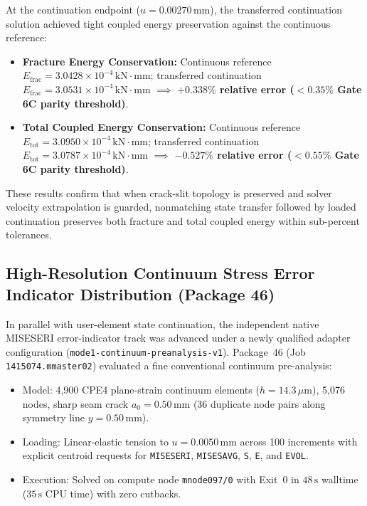 At the continuation endpoint ($u = 0.00270\,\mathrm{mm}$), the transferred continuation solution achieved tight coupled energy preservation against the continuous reference:
\begin{itemize}
  \item \textbf{Fracture Energy Conservation:} Continuous reference $E_{\mathrm{frac}} = 3.0428 \times 10^{-4}\,\mathrm{kN\cdot mm}$; transferred continuation $E_{\mathrm{frac}} = 3.0531 \times 10^{-4}\,\mathrm{kN\cdot mm}$ $\implies$ \textbf{$\mathbf{+0.338\%}$ relative error ($< 0.35\%$ Gate 6C parity threshold)}.
  \item \textbf{Total Coupled Energy Conservation:} Continuous reference $E_{\mathrm{tot}} = 3.0950 \times 10^{-4}\,\mathrm{kN\cdot mm}$; transferred continuation $E_{\mathrm{tot}} = 3.0787 \times 10^{-4}\,\mathrm{kN\cdot mm}$ $\implies$ \textbf{$\mathbf{-0.527\%}$ relative error ($< 0.55\%$ Gate 6C parity threshold)}.
\end{itemize}
These results confirm that when crack-slit topology is preserved and solver velocity extrapolation is guarded, nonmatching state transfer followed by loaded continuation preserves both fracture and total coupled energy within sub-percent tolerances.

\subsection{High-Resolution Continuum Stress Error Indicator Distribution (Package 46)}
\label{subsec:method_c_continuum_preanalysis}

In parallel with user-element state continuation, the independent native MISESERI error-indicator track was advanced under a newly qualified adapter configuration (\texttt{mode1-continuum-preanalysis-v1}). Package~46 (Job \texttt{1415074.mmaster02}) evaluated a fine conventional continuum pre-analysis:
\begin{itemize}
  \item Model: 4,900 CPE4 plane-strain continuum elements ($h = 14.3\,\mu\mathrm{m}$), 5,076 nodes, sharp seam crack $a_0 = 0.50\,\mathrm{mm}$ (36 duplicate node pairs along symmetry line $y = 0.50\,\mathrm{mm}$).
  \item Loading: Linear-elastic tension to $u = 0.0050\,\mathrm{mm}$ across 100 increments with explicit centroid requests for \texttt{MISESERI}, \texttt{MISESAVG}, \texttt{S}, \texttt{E}, and \texttt{EVOL}.
  \item Execution: Solved on compute node \texttt{mnode097/0} with Exit~0 in $48\,\mathrm{s}$ walltime ($35\,\mathrm{s}$ CPU time) with zero cutbacks.
\end{itemize}

